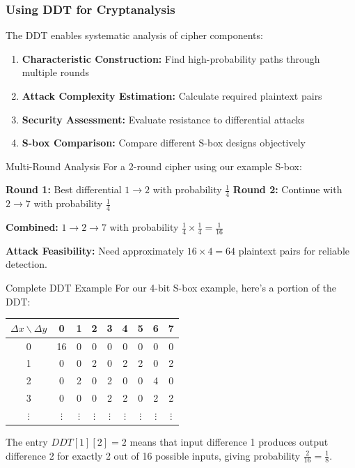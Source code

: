 \documentclass[12pt,a4paper]{article}
\theoremstyle{definition}
\newcommand{\diff}{\Delta}
\begin{document}
\subsubsection{Using DDT for Cryptanalysis}

The DDT enables systematic analysis of cipher components:

\begin{enumerate}
    \item \textbf{Characteristic Construction:} Find high-probability paths through multiple rounds
    \item \textbf{Attack Complexity Estimation:} Calculate required plaintext pairs
    \item \textbf{Security Assessment:} Evaluate resistance to differential attacks
    \item \textbf{S-box Comparison:} Compare different S-box designs objectively
\end{enumerate}

\begin{examplebox}{Multi-Round Analysis}
For a 2-round cipher using our example S-box:

\textbf{Round 1:} Best differential $1 \rightarrow 2$ with probability $\frac{1}{4}$
\textbf{Round 2:} Continue with $2 \rightarrow 7$ with probability $\frac{1}{4}$

\textbf{Combined:} $1 \rightarrow 2 \rightarrow 7$ with probability $\frac{1}{4} \times \frac{1}{4} = \frac{1}{16}$

\textbf{Attack Feasibility:} Need approximately $16 \times 4 = 64$ plaintext pairs for reliable detection.
\end{examplebox}

\begin{examplebox}{Complete DDT Example}
For our 4-bit S-box example, here's a portion of the DDT:

\begin{center}
\begin{tabular}{c|cccccccc}
$\diff x \backslash \diff y$ & 0 & 1 & 2 & 3 & 4 & 5 & 6 & 7 \\
\hline
0 & 16 & 0 & 0 & 0 & 0 & 0 & 0 & 0 \\
1 & 0 & 0 & 2 & 0 & 2 & 2 & 0 & 2 \\
2 & 0 & 2 & 0 & 2 & 0 & 0 & 4 & 0 \\
3 & 0 & 0 & 0 & 2 & 2 & 0 & 2 & 2 \\
$\vdots$ & $\vdots$ & $\vdots$ & $\vdots$ & $\vdots$ & $\vdots$ & $\vdots$ & $\vdots$ & $\vdots$ \\
\end{tabular}
\end{center}

The entry $DDT[1][2] = 2$ means that input difference 1 produces output difference 2 for exactly 2 out of 16 possible inputs, giving probability $\frac{2}{16} = \frac{1}{8}$.
\end{examplebox}
\end{document}
